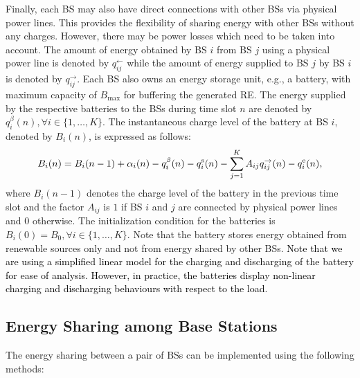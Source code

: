\documentclass[10pt, letter,twocolumn]{IEEEtran}
\begin{document}
Finally, each BS may also have direct connections with other BSs via physical power lines. This provides the flexibility of sharing energy with other BSs without any charges. However, there may be power losses which need to be taken into account. The amount of energy obtained by BS $i$ from BS $j$ using a physical power line is denoted by $q^{\leftarrow}_{ij}$ while the amount of energy supplied to BS $j$ by BS $i$ is denoted by $q^{\rightarrow}_{ij}$. Each BS also owns an energy storage unit, e.g., a battery, with maximum capacity of $B_{\max}$ for buffering the generated RE. The energy supplied by the respective batteries to the BSs during time slot $n$ are denoted by $q_{i}^{\beta}(n), \forall i \in \{1,\ldots, K\}$. The instantaneous charge level of the battery at BS $i$, denoted by $B_{i}(n)$, is expressed as follows:
\begin{equation}\label{batt_level}
\small
  B_{i}(n) = B_{i}(n-1) + \alpha_{i}(n) - q_{i}^{\beta}(n) - q_{i}^{\text{s}}(n) - \sum \limits_{j = 1}^{K} A_{ij}q^{\rightarrow}_{ij}(n)- q_{i}^{\text{e}}(n),
\end{equation}
where $B_{i}(n - 1)$ denotes the charge level of the battery in the previous time slot and the factor $A_{ij}$ is $1$ if BS $i$ and $j$ are connected by physical power lines and $0$ otherwise. The initialization condition for the batteries is $B_{i}(0) = B_{0}, \forall i \in \{1, \ldots,K\}$. Note that the battery stores energy obtained from renewable sources only and not from energy shared by other BSs. \textcolor{black}{Note that we are using a simplified linear model for the charging and discharging of the battery for ease of analysis. However, in practice, the batteries display non-linear charging and discharging behaviours with respect to the load}.
\vspace{-0.0cm}
\subsection{Energy Sharing among Base Stations}
The energy sharing between a pair of BSs can be implemented using the following methods:
\vspace{-0.0cm}
\end{document}
